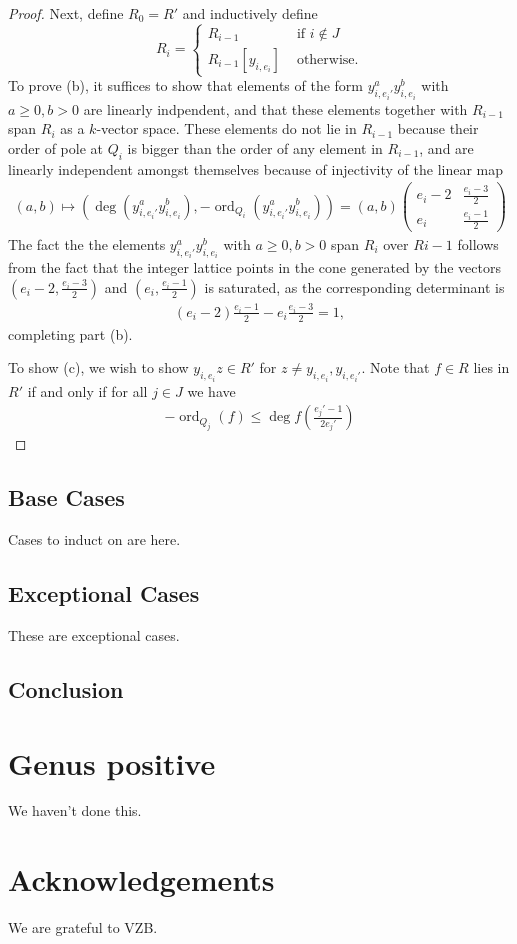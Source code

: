 \documentclass{amsart}
\theoremstyle{plain}
\theoremstyle{definition}
\theoremstyle{remark}
\numberwithin{equation}{section}
\newcommand\ssec{\subsection}
\DeclareMathOperator{\ord}{ord}
\newcommand \subhalf[1]{\frac{{#1} - 1}{2{#1}}}
\begin{document}
\begin{proof}
Next, define $R_0 = R'$ and inductively define 
$$
R_i = \begin{cases}
	R_{i-1} &\text{ if }i \notin J\\
	R_{i-1}[y_{i,e_i}] &\text{ otherwise.} 
\end{cases}$$
To prove (b), it suffices to show that elements of the form $y_{i,e_i'}^ay_{i,e_i}^b$ with $a \geq 0, b > 0$ are linearly indpendent, and that these elements together with $R_{i-1}$ span $R_i$ as a $k$-vector space. These elements do not lie in $R_{i-1}$ because their order of pole at $Q_i$ is bigger than the order of any element in $R_{i-1}$, and are linearly independent amongst themselves because of injectivity of the linear map
\begin{align*}
	(a,b) \mapsto \left( \deg\left(y_{i,e_i'}^ay_{i,e_i}^b\right),-\ord_{Q_i}\left( y_{i,e_i'}^ay_{i,e_i}^b \right)  \right) = (a,b) \begin{pmatrix}
	e_i-2 & \frac{e_i-3}{2} \\
	e_i	 & \frac{e_i-1}{2}
\end{pmatrix} 
\end{align*}
The fact the the elements $y_{i,e_i'}^ay_{i,e_i}^b$ with $a \geq 0, b > 0$ span $R_i$ over $R{i-1}$ follows from the fact that the integer lattice points in the cone generated by the vectors $\left(e_i-2, \frac{e_i-3}{2} \right)$ and $\left(e_i, \frac{e_i-1}{2} \right)$ is saturated, as the corresponding determinant is
\begin{align*}
	(e_i-2) \frac{e_i-1}{2} - e_i \frac{e_i-3}{2} = 1,
\end{align*}
completing part (b).

To show (c), we wish to show $y_{i,e_i}z \in R'$ for $z \neq y_{i,e_i},y_{i,e_i'}$. Note that $f\in R$ lies in $R'$ if and only if for all $j \in J$ we have
\begin{align*}
	-\ord_{Q_j}(f) \leq \deg f \left( \subhalf {e_j'} \right) 
\end{align*}


\end{proof}

\ssec{Base Cases}
\label{ssec:g_0_base}
Cases to induct on are here.

\ssec{Exceptional Cases}
\label{ssec:g_0_exceptional}
These are exceptional cases.

\ssec{Conclusion}
\label{ssec:g_0_conclusion}

\section{Genus positive}
We haven't done this.

\section{Acknowledgements}
We are grateful to VZB.

\nocite{*}
{}

\end{document}
